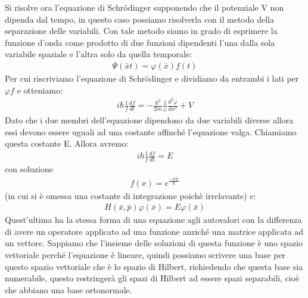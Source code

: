 Si risolve ora l'equazione di Schrödinger supponendo che il potenziale V non dipenda dal tempo, in questo caso possiamo risolverla con il metodo della separazione delle variabili. Con tale metodo siamo in grado di esprimere la funzione d'onda come prodotto di due funzioni dipendenti l'una dalla sola variabile spaziale e l'altra solo da quella temporale:
\begin{equation}\begin{split}
\Psi\left(\bar x t\right)=\varphi\left(\bar x\right)f\left(t\right)
\end{split}\end{equation}
Per cui riscriviamo l'equazione di Schrödinger e dividiamo da entrambi i lati per $\varphi f$ e otteniamo:
\begin{equation}\begin{split}
i\hbar\frac{1}{f}\frac{df}{dt}=-\frac{\hbar^2}{2m}\frac{1}{\varphi}\frac{d^2 \varphi}{dx^2}+V
\end{split}\end{equation}
Dato che i due membri dell'equazione dipendono da due variabili diverse allora essi devono essere uguali ad una costante affinché l'equazione valga. Chiamiamo questa costante E.
Allora avremo:
\begin{equation}\begin{split}
i\hbar\frac{1}{f}\frac{df}{dt}=E
\end{split}\end{equation}
con soluzione
\begin{equation}\begin{split}
f(x)=e^{\frac{-itE}{\hbar}}
\end{split}\end{equation}
(in cui si è omessa una costante di integrazione poichè irrelavante) e:
\begin{equation}\begin{split}
H\left(\bar x,\bar p \right)\varphi\left(\bar x\right)=E\varphi\left(\bar x\right)
\end{split}\end{equation}
Quest'ultima ha la stessa forma di una equazione agli autovalori con la differenza di avere un operatore applicato ad una funzione anziché una matrice applicata ad un vettore. Sappiamo che l'insieme delle soluzioni di questa funzione è uno spazio vettoriale perché l'equazione è lineare, quindi possiamo scrivere una base per questo spazio vettoriale che è lo spazio di Hilbert, richiedendo che questa base sia numerabile, questo restringerà gli spazi di Hilbert ad essere spazi separabili, cioè che abbiano una base ortonormale.

